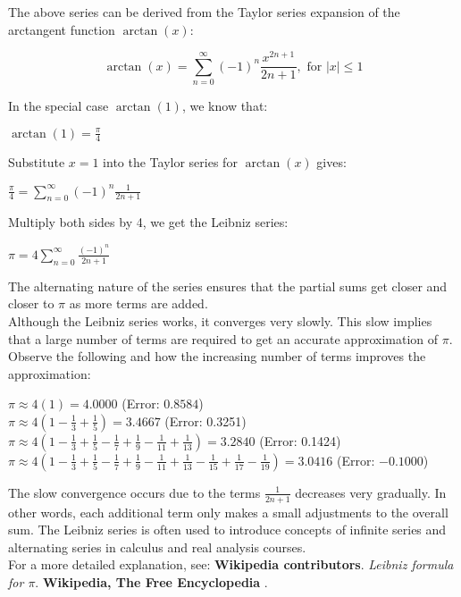 \documentclass[12pt]{article}
\begin{document}
\noindent The above series can be derived from the Taylor series expansion of the arctangent function $\arctan(x)$:

\begin{equation}
    \arctan(x) = \sum_{n=0}^\infty (-1)^n\frac{x^{2n+1}}{2n+1}, \text{ for } |x| \leq 1
\end{equation}

\noindent In the special case $\arctan(1)$, we know that:
\begin{center}
    $\arctan(1) = \frac{\pi}{4}$
\end{center}
Substitute $x = 1$ into the Taylor series for $\arctan(x)$ gives:
\begin{center}
    $\frac{\pi}{4} = \sum\limits_{n=0}^\infty (-1)^n \frac{1}{2n+1}$
\end{center}
Multiply both sides by 4, we get the Leibniz series:
\begin{center}
    $\pi = 4\sum\limits_{n=0}^\infty \frac{(-1)^n}{2n+1}$
\end{center}

\noindent The alternating nature of the series ensures that the partial sums get closer and closer to $\pi$ as more terms are added.\\

\noindent Although the Leibniz series works, it converges very slowly. This slow implies that a large number of terms are required to get an accurate approximation of $\pi$.\\

\noindent Observe the following and how the increasing number of terms improves the approximation:
\begin{center}
    $\pi \approx 4(1) = 4.0000$ (Error: $0.8584$)\\
    \vspace{3mm}
    $\pi \approx  4\left(1 - \frac{1}{3} + \frac{1}{5}\right) = 3.4667$ (Error: 0.3251)\\
    \vspace{3mm}
    $\pi \approx 4\left(1 - \frac{1}{3} + \frac{1}{5} - \frac{1}{7} + \frac{1}{9} - \frac{1}{11} + \frac{1}{13}\right) = 3.2840$ (Error: 0.1424)\\
    \vspace{3mm}
    $\pi \approx 4\left(1 - \frac{1}{3} + \frac{1}{5} - \frac{1}{7} + \frac{1}{9} - \frac{1}{11} + \frac{1}{13} - \frac{1}{15} + \frac{1}{17} - \frac{1}{19}\right) = 3.0416$ (Error: $-0.1000$)
\end{center}
The slow convergence occurs due to the terms $\frac{1}{2n+1}$ decreases very gradually. In other words, each additional term only makes a small adjustments to the overall sum. The Leibniz series is often used to introduce concepts of infinite series and alternating series in calculus and real analysis courses. \\

\noindent For a more detailed explanation, see: \textbf{Wikipedia contributors}. \textit{Leibniz formula for $\pi$}. \textbf{Wikipedia, The Free Encyclopedia} \cite{wikipedia_leibniz}. 

\newpage



\end{document}
